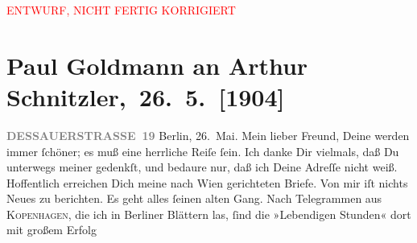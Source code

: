 
\begin{center}
            \textcolor{red}{ENTWURF, NICHT FERTIG KORRIGIERT}
                      \end{center}
            
         
         \renewcommand{\erwaehntePersonen}{Personen: Johannes Nielsen, Olga Schnitzler}
         \renewcommand{\erwaehnteOrte}{Orte: Berlin, Dessauer Straße, Det Kongelige Teater, Kopenhagen, Neapel, Wien}
         \renewcommand{\erwaehnteWerke}{Werke: Lebendige Stunden. Vier Einakter, Levende Timer. Skuespil i 1 akt}
               \section[ Paul Goldmann an Arthur Schnitzler, 26. 5. {[}1904{]}]{ Paul Goldmann an Arthur Schnitzler, 26. 5. {[}1904{]}}\nopagebreak{}\rehead{ }\begin{ledgroupsized}[t]{13cm}\normalsize\beginnumbering \toendnotes[C]{\smallbreak\pagebreak[2]} 
\toendnotes[C]{\smallbreak}\pstart
           \noindent{}\raggedleft{}{\pb}\textcolor{gray}{\textbf{DESSAUERSTRASSE 19}}\pend
           \pstart
           Berlin, 26. Mai.\pend
           \pstart{}Mein lieber Freund,\pend\pstart
           Deine \label{K_L03444-1v}\label{K_L03444-1h} werden immer ſchöner;  es muß eine
               herrliche Reiſe ſein. Ich danke Dir vielmals, daß Du unterwegs meiner gedenkſt, und
               bedaure nur, daß ich Deine Adreſſe nicht weiß. Hoffentlich erreichen Dich meine nach
                  Wien gerichteten Briefe.\pend
           \pstart
           Von mir iſt nichts Neues zu berichten. Es geht alles ſeinen alten Gang.\pend
           \pstart
           Nach Telegrammen aus \textsc{Kopenhagen}, die ich in Berliner Blättern las, ſind die
                  »Lebendigen Stunden« {\pb}dort mit großem Erfolg

\end{ledgroupsized}
